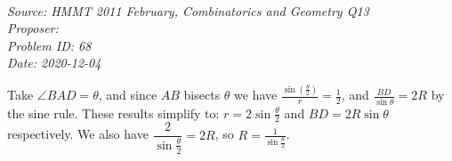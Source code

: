 \SSbreak\\
\emph{Source: HMMT 2011 February, Combinatorics and Geometry Q13}\\
\emph{Proposer: \Pss}\\
\emph{Problem ID: 68}\\
\emph{Date: 2020-12-04}\\
\SSbreak

\bigskip

\begin{solution}\hfil\medskip

Take \(\angle BAD=\theta\), and since \(AB\) bisects \(\theta\) we have \(\frac{\sin\left(\frac{\theta}{2}\right)}{r}=\frac{1}{2}\), and \(\frac{BD}{\sin\theta}=2R\) by the sine rule. These results simplify to: \(r=2\sin\frac{\theta}{2}\) and \(BD=2R\sin\theta\) respectively. We also have \(\dfrac{2}{\sin\frac{\theta}{2}}=2R\), so \(R=\frac{1}{\sin\frac{\theta}{2}}\).


\end{solution}
